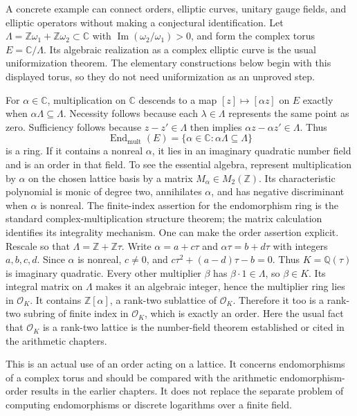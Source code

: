 A concrete example can connect orders, elliptic curves, unitary gauge
fields, and elliptic operators without making a conjectural identification.
Let $\Lambda=\mathbb Z\omega_1+\mathbb Z\omega_2\subset\mathbb C$
with $\operatorname{Im}(\omega_2/\omega_1)>0$, and form the complex
torus $E=\mathbb C/\Lambda$.  Its algebraic realization as a complex
elliptic curve is the usual uniformization theorem.  The elementary
constructions below begin with this displayed torus, so they do not need
uniformization as an unproved step.

For $\alpha\in\mathbb C$, multiplication on $\mathbb C$ descends to
a map $[z]\mapsto[\alpha z]$ on $E$ exactly when
$\alpha\Lambda\subseteq\Lambda$.  Necessity follows because each
$\lambda\in\Lambda$ represents the same point as zero.  Sufficiency
follows because $z-z'\in\Lambda$ then implies
$\alpha z-\alpha z'\in\Lambda$.  Thus
\[
 \operatorname{End}_{\mathrm{mult}}(E)
 =\{\alpha\in\mathbb C:\alpha\Lambda\subseteq\Lambda\}
\]
is a ring.  If it contains a nonreal $\alpha$, it lies in an imaginary
quadratic number field and is an order in that field.  To see the essential
algebra, represent multiplication by $\alpha$ on the chosen lattice basis
by a matrix $M_\alpha\in M_2(\mathbb Z)$.  Its characteristic
polynomial is monic of degree two, annihilates $\alpha$, and has negative
discriminant when $\alpha$ is nonreal.  The finite-index assertion for the
endomorphism ring is the standard complex-multiplication structure theorem;
the matrix calculation identifies its integrality mechanism.  One can make
the order assertion explicit.  Rescale so that
$\Lambda=\mathbb Z+\mathbb Z\tau$.  Write $\alpha=a+c\tau$ and
$\alpha\tau=b+d\tau$ with integers $a,b,c,d$.  Since $\alpha$ is
nonreal, $c\ne0$, and $c\tau^2+(a-d)\tau-b=0$.  Thus
$K=\mathbb Q(\tau)$ is imaginary quadratic.  Every other multiplier
$\beta$ has $\beta\cdot1\in\Lambda$, so $\beta\in K$.
Its integral matrix on $\Lambda$ makes it an algebraic integer, hence
the multiplier ring lies in $\mathcal O_K$.  It contains
$\mathbb Z[\alpha]$, a rank-two sublattice of $\mathcal O_K$.
Therefore it too is a rank-two subring of finite index in
$\mathcal O_K$, which is exactly an order.  Here the usual fact that
$\mathcal O_K$ is a rank-two lattice is the number-field theorem
established or cited in the arithmetic chapters.

This is an actual use of an order acting on a lattice.  It concerns
endomorphisms of a complex torus and should be compared with the arithmetic
endomorphism-order results in the earlier chapters.  It does not replace
the separate problem of computing endomorphisms or discrete logarithms
over a finite field.

